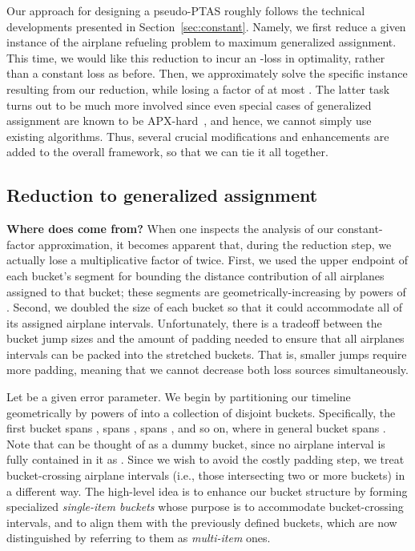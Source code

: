 \documentclass[11pt]{article}
\theoremstyle{plain}
\theoremstyle{definition}
\begin{document}
\smallskip {} Our approach for designing a pseudo-PTAS roughly follows the technical developments presented in Section~\ref{sec:constant}. Namely, we first reduce a given instance of the airplane refueling problem to maximum generalized assignment. This time, we would like this reduction to incur an -loss in optimality, rather than a constant loss as before. Then, we approximately solve the specific instance resulting from our reduction, while losing a factor of at most . The latter task turns out to be much more involved since even special cases of generalized assignment are known to be APX-hard~\cite{ChekuriK05}, and hence, we cannot simply use existing algorithms. Thus, several crucial modifications and enhancements are added to the overall framework, so that we can tie it all together.

\subsection{Reduction to generalized assignment} \label{subsec:reduction_generalized_assign}

{\bf Where does  come from?} When one inspects the analysis of our constant-factor approximation, it becomes apparent that, during the reduction step, we actually lose a multiplicative factor of  twice. First, we used the upper endpoint of each bucket's segment for bounding the distance contribution of all airplanes assigned to that bucket; these segments are geometrically-increasing by powers of . Second, we doubled the size of each bucket so that it could accommodate all of its assigned airplane intervals. Unfortunately, there is a tradeoff between the bucket jump sizes and the amount of padding needed to ensure that all airplanes intervals can be packed into the stretched buckets. That is, smaller jumps require more padding, meaning that we cannot decrease both loss sources simultaneously.

\smallskip {} Let  be a given error parameter. We begin by partitioning our timeline  geometrically by powers of  into a collection of  disjoint buckets. Specifically, the first bucket  spans ,  spans ,  spans , and so on, where in general bucket  spans . Note that  can be thought of as a dummy bucket, since no airplane interval is fully contained in it as . Since we wish to avoid the costly padding step, we treat bucket-crossing airplane intervals (i.e., those intersecting two or more buckets) in a different way. The high-level idea is to enhance our bucket structure by forming specialized \textit{single-item buckets} whose purpose is to accommodate bucket-crossing intervals, and to align them with the previously defined buckets, which are now distinguished by referring to them as \textit{multi-item} ones.
\end{document}
